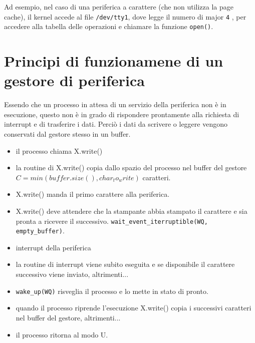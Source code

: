 \documentclass[12pt, a4paper]{report}
\begin{document}
Ad esempio, nel caso di una periferica a carattere (che non utilizza la page
cache), il kernel accede al file \texttt{/dev/tty1}, dove legge il numero di
major \texttt{4} , per accedere alla tabella delle operazioni e chiamare la
funzione \texttt{open()}.

\section{Principi di funzionamene di un gestore di periferica}
Essendo che un processo in attesa di un servizio della periferica non è in
esecuzione, questo non è in grado di rispondere prontamente alla richiesta di
interrupt e di trasferire i dati. Perciò i dati da scrivere o leggere vengono
conservati dal gestore stesso in un buffer.
\begin{itemize}\label{write}
	\item il processo chiama X.write()
	\item la routine di X.write() copia dallo spazio del processo nel buffer
		del gestore $C = min(buffer.size(), char_to_write)$ caratteri. 
	\item X.write() manda il primo carattere alla periferica.
	\item X.write() deve attendere che la stampante abbia stampato il carattere
		e sia pronta a ricevere il successivo.
		\texttt{wait\_event\_iterruptible(WQ, empty\_buffer)}.
	\item interrupt della periferica
	\item la routine di interrupt viene subito eseguita e se disponibile il
		carattere successivo viene inviato, altrimenti...
	\item \texttt{wake\_up(WQ)} risveglia il processo e lo mette in stato di
		pronto.
	\item quando il processo riprende l'esecuzione X.write() copia i successivi
		caratteri nel buffer del gestore, altrimenti...
	\item il processo ritorna al modo U.
\end{itemize}
\end{document}

